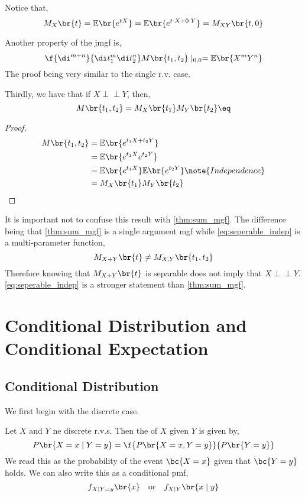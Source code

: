 \documentclass{article}
\newcommand{\indep}{\!\!\perp\!\!\!\!\perp\!\!}
\newcommand{\Exp}{\mathbb{E}}
\newcommand{\Mom}{M}
\begin{document}
Notice that,
\[ \Mom_X\br{t} = \Exp\br{e^{tX}} = \Exp\br{e^{t\cdot X + 0\cdot Y}} = M_{XY}\br{t, 0} \]

Another property of the jmgf is,
\[ \f{\di^{m+n}}{\di t_1^m \di t_2^n} M\br{t_1, t_2} \mid_{0,0} = \Exp\br{X^m Y^n} \]
The proof being very similar to the single r.v. case.

Thirdly, we have that if $X \indep Y$, then,
\[ \Mom\br{t_1, t_2} = \Mom_{X}\br{t_1}\Mom_{Y}\br{t_2} \eq \label{eq:seperable_indep}\]

\begin{proof}
    \begin{align*}
        \Mom\br{t_1, t_2} &= \Exp\br{e^{t_1 X + t_2 Y}} \\
        &= \Exp\br{e^{t_1 X}e^{t_2 Y}} \\
        &= \Exp\br{e^{t_1 X}}\Exp\br{e^{t_2 Y}} \note{Independence}\\
        &= \Mom_X\br{t_1}\Mom_Y\br{t_2}
    \end{align*}
\end{proof}
\begin{remark}
    It is important not to confuse this result with \cref{thm:sum_mgf}. The difference being that \cref{thm:sum_mgf} is a single argument mgf while \cref{eq:seperable_indep} is a multi-parameter function,
    \[ \Mom_{X+Y}\br{t} \neq M_{X,Y}\br{t_1, t_2} \]
    Therefore knowing that $\Mom_{X+Y}\br{t}$ is separable does not imply that $X \indep Y$. \cref{eq:seperable_indep} is a stronger statement than \cref{thm:sum_mgf}.
\end{remark}

\section{Conditional Distribution and Conditional Expectation}
\subsection{Conditional Distribution}
We first begin with the discrete case.
\begin{definition}
    Let $X$ and $Y$ ne discrete r.v.s. Then the  of $X$ given $Y$ is given by,
    \[ P\br{X=x\mid Y=y} = \f{P\br{X=x, Y=y}}{P\br{Y=y}} \]
    We read this as the probability of the event $\bc{X = x}$ given that $\bc{Y=y}$ holds. We can also write this as a conditional pmf,
    \[ f_{X\mid Y=y}\br{x} \quad \text{or} \quad f_{X\mid Y}\br{x \mid y} \]
\end{definition}
\end{document}
